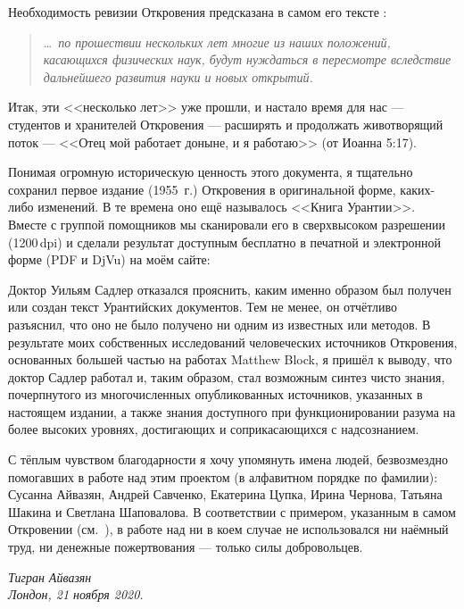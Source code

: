 Необходимость ревизии Откровения предсказана в самом его тексте :
\begin{quote}
\ldots\itshape\ по прошествии нескольких лет многие из наших положений, касающихся физических наук, будут нуждаться в пересмотре вследствие дальнейшего развития науки и новых открытий.
\end{quote}
Итак, эти <<несколько лет>> уже прошли, и настало время для нас --- студентов и хранителей Откровения --- расширять и
продолжать животворящий поток  --- <<Отец мой работает доныне, и я работаю>> (от Иоанна 5:17).

Понимая огромную историческую ценность этого документа,
я тщательно сохранил первое издание (1955~г.) Откровения в оригинальной форме,  каких-либо изменений.
В те времена оно ещё называлось <<Книга Урантии>>.
Вместе с группой помощников мы сканировали его в сверхвысоком разрешении (1200\,dpi) и сделали результат доступным бесплатно
в печатной и электронной форме (PDF и DjVu) на моём сайте:

\begin{center}
\end{center}

Доктор Уильям Садлер отказался прояснить, каким именно образом был получен или создан текст Урантийских документов.
Тем не менее, он отчётливо разъяснил, что оно не было получено ни одним из известных
 или  методов.
В результате моих собственных исследований человеческих источников Откровения, основанных большей частью
на работах Matthew Block, я пришёл к выводу, что доктор Садлер работал
 и, таким образом, стал возможным синтез чисто  знания,
почерпнутого из многочисленных опубликованных источников, указанных в настоящем издании,
а также знания 
доступного при функционировании разума на более высоких уровнях, достигающих и соприкасающихся с надсознанием.

С тёплым чувством благодарности я хочу упомянуть имена людей, безвозмездно помогавших в работе над этим проектом
(в алфавитном порядке по фамилии): Сусанна Айвазян, Андрей Савченко, Екатерина Цупка, Ирина Чернова, Татьяна Шакина
и Светлана Шаповалова.
В соответствии с примером, указанным в самом Откровении (см.~), в работе над
 ни в коем случае не использовался ни наёмный труд, ни денежные пожертвования --- только
силы добровольцев.


\begin{flushleft}
\itshape
Тигран Айвазян\\
Лондон, 21 ноября 2020.\\
\end{flushleft}
